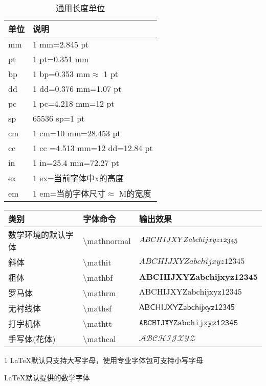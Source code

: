 \documentclass[UTF8,fontset=ubuntu]{ctexart}
\begin{document}
\begin{table}[H]
\begin{tabular}{l l}
	\hline
	单位 & 说明\\
	\hline
	mm & 1 mm=2.845 pt\\
	pt & 1 pt=0.351 mm\\
	bp & 1 bp=0.353 mm$\approx$ 1 pt\\
	dd & 1 dd=0.376 mm=1.07 pt\\
	pc & 1 pc=4.218 mm=12 pt\\
	sp & 65536 sp=1 pt\\
	cm & 1 cm=10 mm=28.453 pt\\
	cc & 1 cc =4.513 mm=12 dd=12.84 pt\\
	in & 1 in=25.4 mm=72.27 pt\\
	ex & 1 ex=当前字体中x的高度\\
	em & 1 em=当前字体尺寸$\approx$ M的宽度\\
	\hline
\end{tabular}
\caption{通用长度单位}
\end{table}

\begin{threeparttable}
\begin{tabular}{l l l}
	\hline
	类别 & 字体命令 & 输出效果\\\hline
	数学环境的默认字体 & \textbackslash mathnormal & $\mathnormal{ABCHIJXYZabchijxyz12345}$\\
	斜体 & \textbackslash mathit & $\mathit{ABCHIJXYZabchijxyz12345}$\\
	粗体 & \textbackslash mathbf & $\mathbf{ABCHIJXYZabchijxyz12345}$\\
	罗马体 & \textbackslash mathrm & $\mathrm{ABCHIJXYZabchijxyz12345}$\\
	无衬线体 & \textbackslash mathsf & $\mathsf{ABCHIJXYZabchijxyz12345}$\\
	打字机体 & \textbackslash mathtt & $\mathtt{ABCHIJXYZabchijxyz12345}$\\
	手写体(花体)\tnote{1} & \textbackslash mathcal & $\mathcal{ABCHIJXYZ}$\\\hline
\end{tabular}
\begin{tablenotes}
	\item[1] LaTeX默认只支持大写字母，使用专业字体包可支持小写字母
\end{tablenotes}
\caption{LaTeX默认提供的数学字体}
\end{threeparttable}
\end{document}
